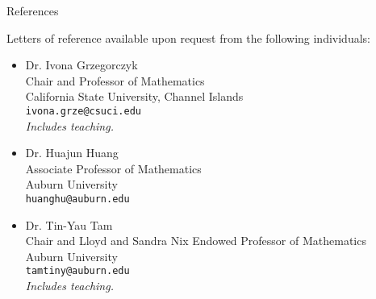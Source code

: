 \documentclass[11pt]{article}
\begin{document}

\begin{center}
\huge References
\end{center}

Letters of reference available upon request from the following individuals:

\begin{itemize}
  \item{} Dr. Ivona Grzegorczyk\\
          Chair and Professor of Mathematics\\
          California State University, Channel Islands\\
          \texttt{ivona.grze@csuci.edu}\\
          \emph{Includes teaching.}
  \item{} Dr. Huajun Huang\\
          Associate Professor of Mathematics\\
          Auburn University\\
          \texttt{huanghu@auburn.edu}
  \item{} Dr. Tin-Yau Tam\\
          Chair and Lloyd and Sandra Nix Endowed Professor of Mathematics\\
          Auburn University\\
          \texttt{tamtiny@auburn.edu}\\
          \emph{Includes teaching.}
\end{itemize}

\label{page:last}
\end{document}
